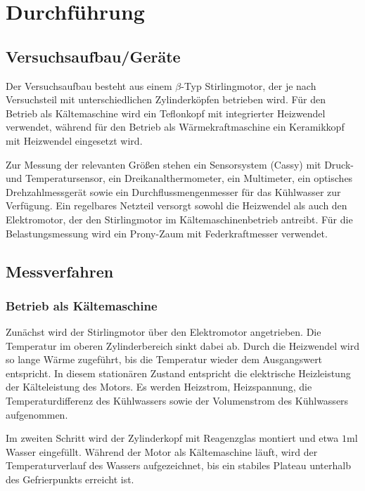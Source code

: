 \chapter{Durchführung} \label{ch:Durchfuehrung}

\section{Versuchsaufbau/Geräte} \label{sec:Aufbau}

Der Versuchsaufbau besteht aus einem \(\beta\)-Typ Stirlingmotor, der je nach Versuchsteil mit unterschiedlichen Zylinderköpfen betrieben wird. Für den Betrieb als Kältemaschine wird ein Teflonkopf mit integrierter Heizwendel verwendet, während für den Betrieb als Wärmekraftmaschine ein Keramikkopf mit Heizwendel eingesetzt wird. 

Zur Messung der relevanten Größen stehen ein Sensorsystem (Cassy) mit Druck- und Temperatursensor, ein Dreikanalthermometer, ein Multimeter, ein optisches Drehzahlmessgerät sowie ein Durchflussmengenmesser für das Kühlwasser zur Verfügung. Ein regelbares Netzteil versorgt sowohl die Heizwendel als auch den Elektromotor, der den Stirlingmotor im Kältemaschinenbetrieb antreibt. Für die Belastungsmessung wird ein Prony-Zaum mit Federkraftmesser verwendet.

\section{Messverfahren} \label{sec:Messverfahren}

\subsection{Betrieb als Kältemaschine}

Zunächst wird der Stirlingmotor über den Elektromotor angetrieben. Die Temperatur im oberen Zylinderbereich sinkt dabei ab. Durch die Heizwendel wird so lange Wärme zugeführt, bis die Temperatur wieder dem Ausgangswert entspricht. In diesem stationären Zustand entspricht die elektrische Heizleistung der Kälteleistung des Motors. Es werden Heizstrom, Heizspannung, die Temperaturdifferenz des Kühlwassers sowie der Volumenstrom des Kühlwassers aufgenommen.

Im zweiten Schritt wird der Zylinderkopf mit Reagenzglas montiert und etwa \(1\mathrm{ml}\) Wasser eingefüllt. Während der Motor als Kältemaschine läuft, wird der Temperaturverlauf des Wassers aufgezeichnet, bis ein stabiles Plateau unterhalb des Gefrierpunkts erreicht ist. 

